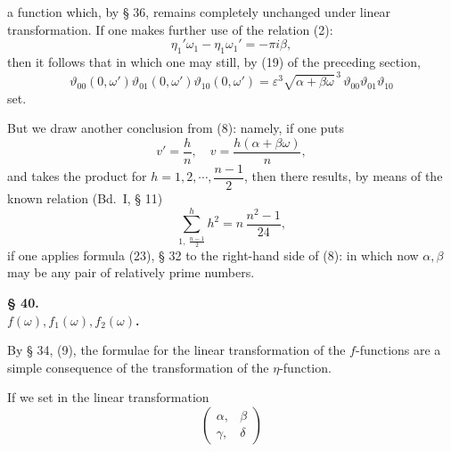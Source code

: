 a function which, by § 36, remains completely unchanged under linear transformation. If one makes further use of the relation (2):
\[
\eta_1'\omega_1 - \eta_1\omega_1' = -\pi i \beta,
\]
then it follows that
in which one may still, by (19) of the preceding section,
\[
\vartheta_{00}(0,\omega')\vartheta_{01}(0,\omega')\vartheta_{10}(0,\omega') = \varepsilon^3\sqrt{\alpha+\beta\omega}^{\,3}\,\vartheta_{00}\vartheta_{01}\vartheta_{10}
\]
set.

But we draw another conclusion from (8): namely, if one puts
\[
v' = \frac{h}{n}, \quad v = \frac{h(\alpha+\beta\omega)}{n},
\]
and takes the product for $h=1,2,\cdots,\dfrac{n-1}{2}$, then there results, by means of the known relation (Bd.\ I, § 11)
\[
\sum_{1,\ \frac{n-1}{2}}^{h} h^2 = n\,\frac{n^2-1}{24},
\]
if one applies formula (23), § 32 to the right-hand side of (8):
in which now $\alpha, \beta$ may be any pair of relatively prime numbers.

\begin{center}
\textbf{§ 40. \\
$f(\omega), f_1(\omega), f_2(\omega)$.}
\end{center}

By § 34, (9), the formulae for the linear transformation of the $f$-functions are a simple consequence of the transformation of the $\eta$-function.

If we set in the linear transformation
\[
\begin{pmatrix}\alpha, & \beta\\ \gamma, & \delta\end{pmatrix}
\]
